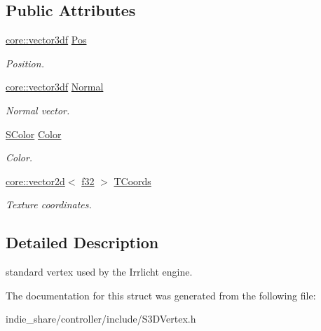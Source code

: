 \subsection*{Public Attributes}
\begin{DoxyCompactItemize}
\item 
\mbox{\label{structirr_1_1video_1_1S3DVertex_ad40e34b3828b1b58283090e20b280e47}} 
\hyperlink{namespaceirr_1_1core_ae6e2b2a6c552833ebbd5b7463d03586b}{core\+::vector3df} \hyperlink{structirr_1_1video_1_1S3DVertex_ad40e34b3828b1b58283090e20b280e47}{Pos}
\begin{DoxyCompactList}\small\item\em Position. \end{DoxyCompactList}\item 
\mbox{\label{structirr_1_1video_1_1S3DVertex_a635ed7b736fdc6932ef19b3bd6e77eb9}} 
\hyperlink{namespaceirr_1_1core_ae6e2b2a6c552833ebbd5b7463d03586b}{core\+::vector3df} \hyperlink{structirr_1_1video_1_1S3DVertex_a635ed7b736fdc6932ef19b3bd6e77eb9}{Normal}
\begin{DoxyCompactList}\small\item\em Normal vector. \end{DoxyCompactList}\item 
\mbox{\label{structirr_1_1video_1_1S3DVertex_a7b94948eda32f0a86512aafb311967e6}} 
\hyperlink{classirr_1_1video_1_1SColor}{S\+Color} \hyperlink{structirr_1_1video_1_1S3DVertex_a7b94948eda32f0a86512aafb311967e6}{Color}
\begin{DoxyCompactList}\small\item\em Color. \end{DoxyCompactList}\item 
\mbox{\label{structirr_1_1video_1_1S3DVertex_aaf765729eac4469ca26786ad3ea4197e}} 
\hyperlink{classirr_1_1core_1_1vector2d}{core\+::vector2d}$<$ \hyperlink{namespaceirr_a0277be98d67dc26ff93b1a6a1d086b07}{f32} $>$ \hyperlink{structirr_1_1video_1_1S3DVertex_aaf765729eac4469ca26786ad3ea4197e}{T\+Coords}
\begin{DoxyCompactList}\small\item\em Texture coordinates. \end{DoxyCompactList}\end{DoxyCompactItemize}


\subsection{Detailed Description}
standard vertex used by the Irrlicht engine. 

The documentation for this struct was generated from the following file\+:\begin{DoxyCompactItemize}
\item 
indie\+\_\+share/controller/include/S3\+D\+Vertex.\+h\end{DoxyCompactItemize}
